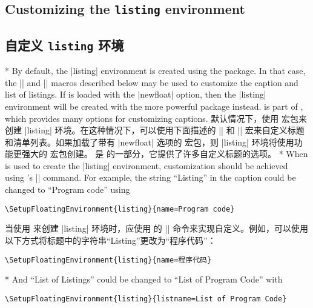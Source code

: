 \begin{paracol}{2}
\subsection*{Customizing the \texttt{listing} environment}
\switchcolumn
\subsection*{自定义 \texttt{listing} 环境}
\switchcolumn[0]*%
By default, the |listing| environment is created using the  package.  In that case, the |\listingscaption| and |\listoflistingscaption| macros described below may be used to customize the caption and list of listings.  If  is loaded with the |newfloat| option, then the |listing| environment will be created with the more powerful \href{http://www.ctan.org/pkg/newfloat}{} package instead.   is part of \href{http://www.ctan.org/pkg/caption}{}, which provides many options for customizing captions.
\switchcolumn
默认情况下，使用  宏包来创建 |listing| 环境。在这种情况下，可以使用下面描述的 |\listingscaption| 和 |\listoflistingscaption| 宏来自定义标题和清单列表。如果加载了带有 |newfloat| 选项的  宏包，则 |listing| 环境将使用功能更强大的 \href{http://www.ctan.org/pkg/newfloat}{} 宏包创建。  是 \href{http://www.ctan.org/pkg/caption}{} 的一部分，它提供了许多自定义标题的选项。
\switchcolumn[0]*%
When  is used to create the |listing| environment, customization should be achieved using 's |\SetupFloatingEnvironment| command.  For example, the string ``Listing'' in the caption could be changed to ``Program code'' using 
\begin{verbatim}
\SetupFloatingEnvironment{listing}{name=Program code}
\end{verbatim}
\switchcolumn
当使用  来创建 |listing| 环境时，应使用  的 |\SetupFloatingEnvironment| 命令来实现自定义。例如，可以使用以下方式将标题中的字符串“Listing”更改为“程序代码”：
\begin{verbatim}
\SetupFloatingEnvironment{listing}{name=程序代码}
\end{verbatim}
\switchcolumn[0]*%
And ``List of Listings'' could be changed to ``List of Program Code'' with 
\begin{verbatim}
\SetupFloatingEnvironment{listing}{listname=List of Program Code}
\end{verbatim}

\end{paracol}
